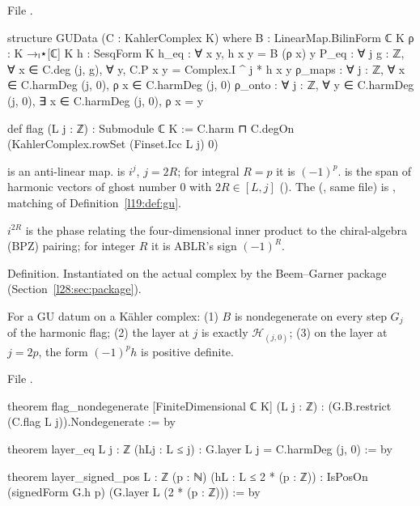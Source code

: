 \noindent File .
\begin{leancode}
structure GUData (C : KahlerComplex K) where
  B : LinearMap.BilinForm ℂ K
  ρ : K →ₗ⋆[ℂ] K
  h : SesqForm K
  h_eq : ∀ x y, h x y = B (ρ x) y
  P_eq : ∀ j g : ℤ, ∀ x ∈ C.deg (j, g), ∀ y, C.P x y = Complex.I ^ j * h x y
  ρ_maps : ∀ j : ℤ, ∀ x ∈ C.harmDeg (j, 0), ρ x ∈ C.harmDeg (j, 0)
  ρ_onto : ∀ j : ℤ, ∀ y ∈ C.harmDeg (j, 0), ∃ x ∈ C.harmDeg (j, 0), ρ x = y

def flag (L j : ℤ) : Submodule ℂ K :=
  C.harm ⊓ C.degOn (KahlerComplex.rowSet (Finset.Icc L j) 0)
\end{leancode}

\begin{dictionary}
 is an anti-linear map.  is $i^j$, $j=2R$; for integral $R=p$ it is $(-1)^p$.  is the span
of harmonic vectors of ghost number $0$ with $2R\in[L,j]$ (). The  (, same file) is
, matching  of Definition~\ref{l19:def:gu}.
\end{dictionary}

\begin{physics}
$i^{2R}$ is the phase relating the four-dimensional inner product to the chiral-algebra (BPZ) pairing; for integer $R$ it is ABLR's sign
$(-1)^R$.
\end{physics}

\begin{status}
Definition. Instantiated on the actual complex by the Beem--Garner package (Section~\ref{l28:sec:package}).
\end{status}

\begin{theorem}\label{l28:thm:bg}
For a GU datum on a Kähler complex: (1) $B$ is nondegenerate on every step $G_j$ of the harmonic flag; (2) the layer at $j$ is exactly
$\mathcal H_{(j,0)}$; (3) on the layer at $j=2p$, the form $(-1)^ph$ is positive definite.
\end{theorem}

\noindent File .
\begin{leancode}
theorem flag_nondegenerate [FiniteDimensional ℂ K] (L j : ℤ) :
    (G.B.restrict (C.flag L j)).Nondegenerate := by

theorem layer_eq {L j : ℤ} (hLj : L ≤ j) : G.layer L j = C.harmDeg (j, 0) := by

theorem layer_signed_pos {L : ℤ} (p : ℕ) (hL : L ≤ 2 * (p : ℤ)) :
    IsPosOn (signedForm G.h p) (G.layer L (2 * (p : ℤ))) := by
\end{leancode}

